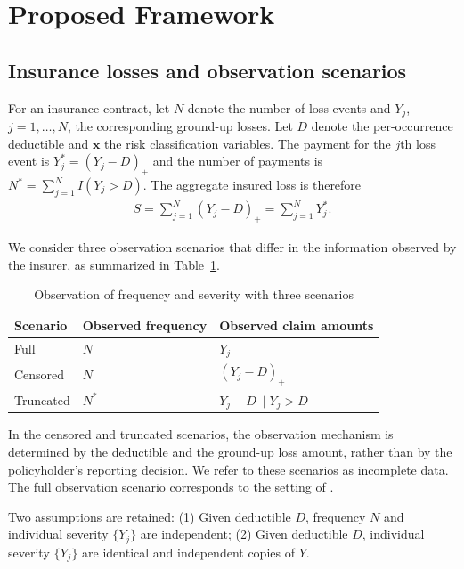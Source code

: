 \documentclass[11pt]{article}
\begin{document}
\section{Proposed Framework}

\subsection{Insurance losses and observation scenarios}
\label{sec:scenario}

For an insurance contract, let $N$ denote the number of loss events
and $Y_j$, $j=1,\ldots,N$, the corresponding ground-up losses.
Let $D$ denote the per-occurrence deductible and $\bm{x}$ the
risk classification variables. The payment for the $j$th loss
event is $Y^*_j=(Y_j-D)_+$ and the number of payments is $N^*=\sum_{j=1}^{N}I(Y_j>D)$. The aggregate insured loss is therefore
\begin{align}
    S=\sum_{j=1}^{N}(Y_j-D)_+=\sum_{j=1}^{N}Y^*_j.
\end{align}

We consider three observation scenarios that differ in the
information observed by the insurer, as summarized in
Table~\ref{tab:reporting_scenarios}.

\begin{table}[h!]
\centering
\begin{tabular}{lll}
\hline
Scenario & Observed frequency & Observed claim amounts \\
\midrule
Full & $N$ & $Y_j$ \\
Censored & $N$ & $(Y_j-D)_+$ \\
Truncated & $N^*$ & $Y_j-D\ \mid Y_j>D$ \\
\bottomrule
\end{tabular}
\caption{Observation of frequency and severity with three scenarios}
\label{tab:reporting_scenarios}
\end{table}

In the censored and truncated scenarios, the observation
mechanism is determined by the deductible and the ground-up
loss amount, rather than by the policyholder's reporting decision.
We refer to these scenarios as incomplete data.
The full observation scenario corresponds to the setting of
\citet{shi2022copula}.

Two assumptions are retained: (1) Given deductible $D$, frequency $N$ and individual severity $\{Y_j\}$ are independent; (2) Given deductible $D$, individual severity $\{Y_j\}$ are identical and independent copies of $Y$. 
\end{document}
